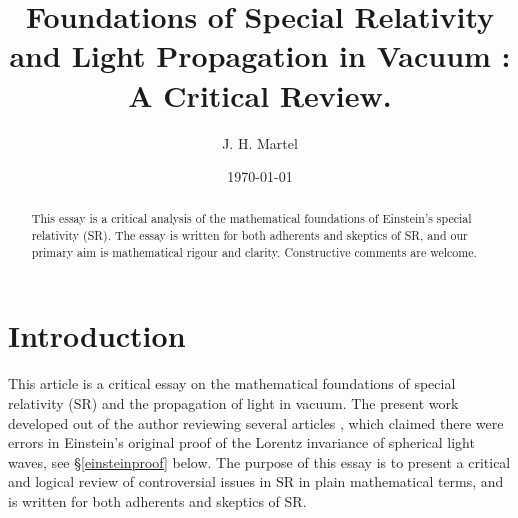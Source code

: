 \documentclass[12pt]{amsart}
\begin{document}
\title[On Critical Foundations of Special Relativity]{Foundations of Special Relativity and Light Propagation in Vacuum : A Critical Review.}


\author{J. H. Martel}
\date{\today}
\maketitle

\begin{abstract}
This essay is a critical analysis of the mathematical foundations of Einstein's special relativity (SR). The essay is written for both adherents and skeptics of SR, and our primary aim is mathematical rigour and clarity. Constructive comments are welcome. 




\end{abstract}
\tableofcontents







\section{Introduction}
This article is a critical essay on the mathematical foundations of special relativity (SR) and the propagation of light in vacuum. The present work developed out of the author reviewing several articles \cite{bryant}, \cite{crothers} which claimed there were errors in Einstein's original proof of the Lorentz invariance of spherical light waves, see \S \ref{einsteinproof} below. The purpose of this essay is to present a critical and logical review of controversial issues in SR in plain mathematical terms, and is written for both adherents and skeptics of SR. 
\end{document}
